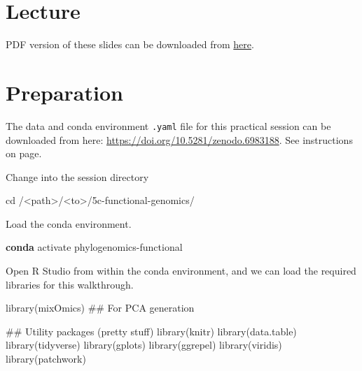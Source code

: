 \documentclass[
  letterpaper,
]{book}
\newenvironment{Shaded}{}{}
\newcommand{\BuiltInTok}[1]{\textcolor[rgb]{0.84,0.23,0.29}{#1}}
\newcommand{\DocumentationTok}[1]{\textcolor[rgb]{0.42,0.45,0.49}{#1}}
\newcommand{\ExtensionTok}[1]{\textcolor[rgb]{0.84,0.23,0.29}{\textbf{#1}}}
\newcommand{\FunctionTok}[1]{\textcolor[rgb]{0.44,0.26,0.76}{#1}}
\newcommand{\NormalTok}[1]{\textcolor[rgb]{0.14,0.16,0.18}{#1}}
\newcommand{\OperatorTok}[1]{\textcolor[rgb]{0.14,0.16,0.18}{#1}}
\begin{document}
\hypertarget{lecture-10}{%
\section{Lecture}\label{lecture-10}}

PDF version of these slides can be downloaded from
\href{https://github.com/SPAAM-community/wss-summer-school/raw/main/docs/assets/slides/2022/5c-intro-to-functional-analysis/SPAAM\%20Summer\%20School\%202022\%20-\%205C\%20-\%20Function\%20Analysis.pdf}{here}.

\hypertarget{preparation}{%
\section{Preparation}\label{preparation}}

The data and conda environment \texttt{.yaml} file for this practical
session can be downloaded from here:
\url{https://doi.org/10.5281/zenodo.6983188}. See instructions on page.

Change into the session directory

\begin{Shaded}
\begin{Highlighting}[]
\BuiltInTok{cd}\NormalTok{ /}\OperatorTok{\textless{}}\NormalTok{path}\OperatorTok{\textgreater{}}\NormalTok{/}\OperatorTok{\textless{}}\NormalTok{to}\OperatorTok{\textgreater{}}\NormalTok{/5c{-}functional{-}genomics/}
\end{Highlighting}
\end{Shaded}

Load the conda environment.

\begin{Shaded}
\begin{Highlighting}[]
\ExtensionTok{conda}\NormalTok{ activate phylogenomics{-}functional}
\end{Highlighting}
\end{Shaded}

Open R Studio from within the conda environment, and we can load the
required libraries for this walkthrough.

\begin{Shaded}
\begin{Highlighting}[]
\FunctionTok{library}\NormalTok{(mixOmics) }\DocumentationTok{\#\# For PCA generation}

\DocumentationTok{\#\# Utility packages (pretty stuff)}
\FunctionTok{library}\NormalTok{(knitr)}
\FunctionTok{library}\NormalTok{(data.table)}
\FunctionTok{library}\NormalTok{(tidyverse)}
\FunctionTok{library}\NormalTok{(gplots)}
\FunctionTok{library}\NormalTok{(ggrepel)}
\FunctionTok{library}\NormalTok{(viridis)}
\FunctionTok{library}\NormalTok{(patchwork)}
\end{Highlighting}
\end{Shaded}
\end{document}
